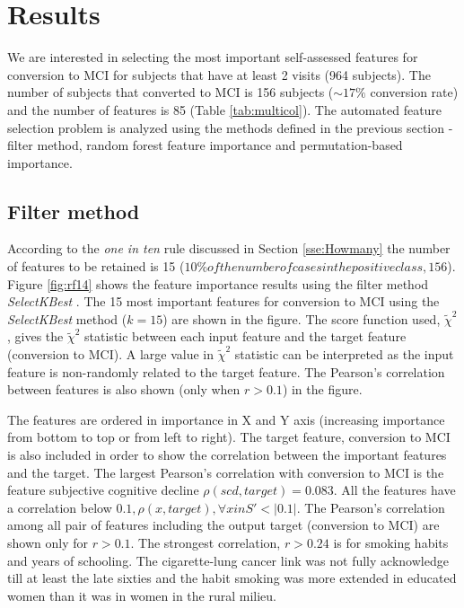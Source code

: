 \documentclass[preprint,12pt]{elsarticle}
\begin{document}
\section{Results}
\label{se:res}

We are interested in selecting the most important self-assessed features for conversion to MCI for subjects that have at least 2 visits (964 subjects). The number of subjects that converted to MCI is 156 subjects ($\sim 17\%$ conversion rate) and the number of features is 85 (Table \ref{tab:multicol}). The automated feature selection problem is analyzed using the methods defined in the previous section -filter method, random forest feature importance and permutation-based importance. 

\subsection{Filter method}
According to the \emph{one in ten} rule discussed in Section \ref{sse:Howmany}
the number of features to be retained is 15 ($10\% of the number of cases in the positive class, 156$). Figure \ref{fig:rf14} shows the feature importance results using the filter method \emph{SelectKBest} \cite{scikit-learn}. The 15 most important features for conversion to MCI using the \emph{SelectKBest} method ($k=15$) are shown in the figure. The score function used, $\tilde{\chi}^2$, gives the $\tilde{\chi}^2$ statistic between each input feature and the target feature (conversion to MCI). A large value in $\tilde{\chi}^2$ statistic can be interpreted as the input feature is non-randomly related to the target feature. The Pearson's correlation between features is also shown (only when $r >0.1$) in the figure. 

The features are ordered in importance in X and Y axis (increasing importance from bottom to top or from left to right). The target feature, conversion to MCI is also included in order to show the correlation between the important features and the target. 
The largest Pearson's correlation with conversion to MCI is the feature subjective cognitive decline $\rho(scd, target) = 0.083$. All the features have a correlation below $0.1, \rho(x, target), \forall x in S' < |0.1|$. The Pearson's correlation among all pair of features including the output target (conversion to MCI) are shown only for $r>0.1$. The strongest correlation, $r>0.24$ is for smoking habits and years of schooling. The cigarette-lung cancer link was not fully acknowledge till at least the late sixties \cite{proctor2012history} and the habit smoking was more extended in educated women than it was in women in the rural milieu.
\end{document}
